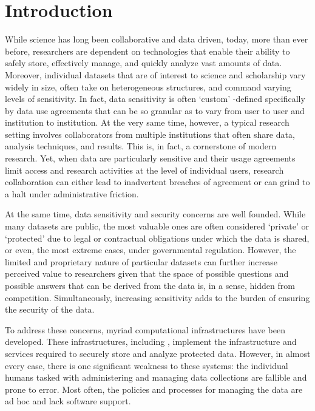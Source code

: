 \section{Introduction}



While science has long been collaborative and data driven, today, more than ever before,
researchers are dependent on technologies that enable their ability to safely store,
effectively manage, and quickly analyze vast amounts of
data. Moreover, individual datasets that are of interest to science and scholarship
vary widely in size, often take on heterogeneous structures, and command varying
levels of sensitivity. In fact, data sensitivity is often `custom' -defined specifically by
data use agreements that can be so granular as to vary from user to user and institution
to institution. At the very same time, however, a typical research setting involves
collaborators from multiple institutions that often share data, analysis techniques,
and results. This is, in fact, a cornerstone of modern research. Yet, when data are
particularly sensitive and their usage agreements limit access and research activities at the
level of individual users, research collaboration can either lead to inadvertent
breaches of agreement or can grind to a halt under administrative friction.


At the same time, data sensitivity and security concerns are well founded. While many datasets are public, the most
valuable ones are often considered `private' or `protected' due to legal or contractual obligations under which the data
is shared, or even, the most extreme cases, under governmental regulation. However, the limited and proprietary nature
of particular datasets can further increase perceived value to researchers given that the space of possible
questions and possible answers that can be derived from the data is, in a sense, hidden from competition.
Simultaneously, increasing sensitivity adds to the burden of ensuring the security of the data.


To address these concerns, myriad computational infrastructures
have been developed. These infrastructures, including \NAME \cite{babuji2016cloud},
implement the infrastructure and services required to securely store and analyze protected
data. However, in almost every case, there is one significant weakness to these systems: the individual humans tasked with administering and managing
data collections are fallible and prone to error. Most often, the policies and processes for managing
the data are ad hoc and lack software support.

